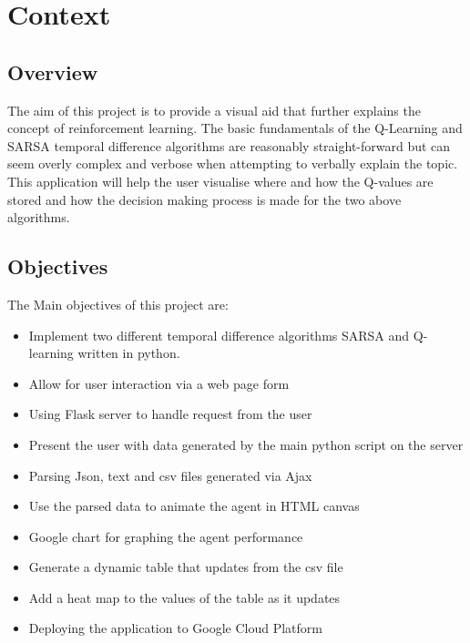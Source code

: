 \chapter{Context}

\section{Overview}
The aim of this project is to provide a visual aid that further explains the concept of reinforcement learning. The basic fundamentals of the Q-Learning and SARSA temporal difference algorithms are reasonably straight-forward but can seem overly complex and verbose when attempting to verbally explain the topic. This application will help the user visualise where and how the Q-values are stored and how the decision making process is made for the two above algorithms.

\section{Objectives}
The Main objectives of this project are:
\begin{itemize}
	\item Implement two different temporal difference algorithms SARSA and Q-learning written in python.
	\item Allow for user interaction via a web page form
	\item Using Flask server to handle request from the user
	\item Present the user with data generated by the main python script on the server 
	\item Parsing Json, text and csv files generated via Ajax
	\item Use the parsed data to animate the agent in HTML canvas
	\item Google chart for graphing the agent performance
	\item Generate a dynamic table that updates from the csv file
	\item Add a heat map to the values of the table as it updates
	\item Deploying the application to Google Cloud Platform

\end{itemize}
 


